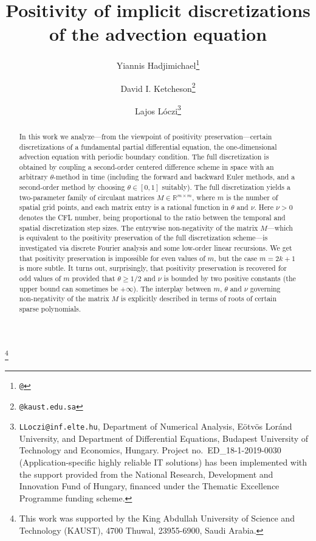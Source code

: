 \documentclass[a4paper]{article}
\title{Positivity of implicit discretizations of the advection equation}
\author{Yiannis Hadjimichael\thanks{\texttt{@} }\and David I. Ketcheson\thanks{\texttt{@kaust.edu.sa}}\and Lajos L\'oczi\thanks{{\texttt{LLoczi@inf.elte.hu}}, Department of Numerical Analysis, E\"otv\"os Lor\'and University, and Department of Differential Equations, Budapest University of Technology and Economics, Hungary. Project no.~ED\_18-1-2019-0030 (Application-specific highly reliable IT solutions) has been implemented with the support provided from the National Research, Development and Innovation Fund of Hungary, financed under the Thematic Excellence Programme funding scheme.}}
\newcommand{\te}{\theta}
\newcommand\blfootnote[1]{%
  \begingroup
  \renewcommand\thefootnote{}\footnote{#1}%
  \addtocounter{footnote}{-1}%
  \endgroup
}
\begin{document}
\maketitle
\begin{abstract}
In this work we analyze---from the viewpoint of positivity preservation---certain discretizations of a fundamental partial differential equation, the one-dimensional advection equation with periodic boundary condition. The full discretization is obtained by coupling a second-order centered difference scheme in space with an arbitrary $\te$-method in time (including the forward and backward Euler methods, and a second-order method by choosing $\te\in [0,1]$ suitably). The full discretization yields a two-parameter family of circulant matrices $M\in\mathbb{R}^{m\times m}$, 
where $m$ is the number of spatial grid points, and each matrix entry is a rational function in $\te$ and $\nu$. Here $\nu>0$ denotes the CFL number, being proportional to the ratio between the temporal and spatial discretization step sizes. The entrywise non-negativity of the matrix $M$---which is equivalent to the positivity preservation of the full discretization scheme---is investigated via discrete Fourier analysis and some low-order linear recursions. We get that positivity preservation is impossible for even values of $m$, but the case $m=2k+1$ is more subtle. It turns out, surprisingly, that positivity preservation is recovered for odd values of $m$ provided that $\te\ge 1/2$ and $\nu$ is bounded by two positive constants (the upper bound can sometimes be $+\infty$). The interplay between $m$, $\te$ and $\nu$ governing non-negativity of the matrix $M$ is explicitly described in terms of roots of certain sparse polynomials. %
\end{abstract}
\blfootnote{This work was supported by the King Abdullah University of Science and Technology (KAUST), 4700
Thuwal, 23955-6900, Saudi Arabia.}
\end{document}
